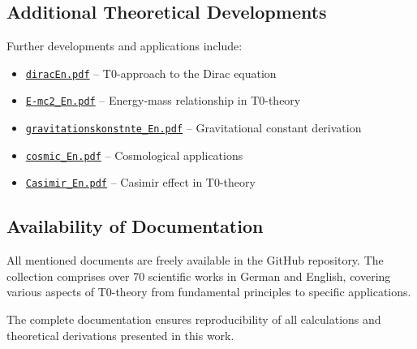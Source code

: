 \documentclass[12pt,a4paper]{article}
\numberwithin{equation}{section}
\begin{document}
	\subsection{Additional Theoretical Developments}
	
	Further developments and applications include:
	
	\begin{itemize}
		\item \href{https://github.com/jpascher/T0-Time-Mass-Duality/blob/main/2/pdf/diracEn.pdf}{\texttt{diracEn.pdf}} -- T0-approach to the Dirac equation
		\item \href{https://github.com/jpascher/T0-Time-Mass-Duality/blob/main/2/pdf/E-mc2_En.pdf}{\texttt{E-mc2\_En.pdf}} -- Energy-mass relationship in T0-theory
		\item \href{https://github.com/jpascher/T0-Time-Mass-Duality/blob/main/2/pdf/gravitationskonstnte_En.pdf}{\texttt{gravitationskonstnte\_En.pdf}} -- Gravitational constant derivation
		\item \href{https://github.com/jpascher/T0-Time-Mass-Duality/blob/main/2/pdf/cosmic_En.pdf}{\texttt{cosmic\_En.pdf}} -- Cosmological applications
		\item \href{https://github.com/jpascher/T0-Time-Mass-Duality/blob/main/2/pdf/Casimir_En.pdf}{\texttt{Casimir\_En.pdf}} -- Casimir effect in T0-theory
	\end{itemize}
	
	\subsection{Availability of Documentation}
	
	All mentioned documents are freely available in the GitHub repository. The collection comprises over 70 scientific works in German and English, covering various aspects of T0-theory from fundamental principles to specific applications.
	
	The complete documentation ensures reproducibility of all calculations and theoretical derivations presented in this work.
	
\end{document}
